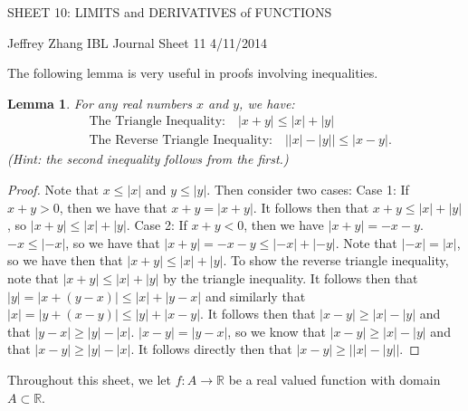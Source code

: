 \documentclass[12pt]{article}
\newcommand{\bbR}{\mathbb{R}}
\providecommand{\abs}[1]{\lvert #1 \rvert}
\providecommand{\arr}{\longrightarrow}
\renewcommand{\_}[1]{\underline{ #1 }}
\newtheorem{lemma}[theorem]{Lemma}
\theoremstyle{definition}
\numberwithin{equation}{subsection}
\begin{document}
\begin{center}
{\large SHEET 10: LIMITS and DERIVATIVES of FUNCTIONS} \\ 
\vspace{.2in}  
\end{center}
Jeffrey Zhang IBL Journal Sheet 11 4/11/2014
\bigskip \bigskip


\setcounter{section}{10}   
\setcounter{theorem}{-1} 

The following lemma is very useful in proofs involving inequalities.

\begin{lemma}  For any real numbers $x$ and $y$, we have: 
\begin{align*}
&\text{The Triangle Inequality:} \quad   \abs{x + y} \leq \abs{x} + \abs{y} \\
&\text{The Reverse Triangle Inequality:} \quad \abs{\abs{x} - \abs{y}} \leq \abs{x - y}.
\end{align*}
(Hint: the second inequality follows from the first.)
\end{lemma}

\begin{proof}
Note that $x \leq \abs{x}$ and $y \leq \abs{y}$. Then consider two cases: \newline
Case 1: If $x + y > 0$, then we have that $x + y = \abs{x + y}$. It follows then that $x + y \leq \abs{x} + \abs{y}$, so $\abs{x + y} \leq \abs{x} + \abs{y}$. \newline
Case 2: If $x + y < 0$, then we have $\abs{x + y} = -x - y$. $-x \leq \abs{-x}$, so we have that $\abs{x + y} = - x - y \leq \abs{-x} + \abs{-y}$. Note that $\abs{-x} = \abs{x}$, so we have then that $\abs{x + y} \leq \abs{x} + \abs{y}$. \newline
To show the reverse triangle inequality, note that $\abs{x + y} \leq \abs{x} + \abs{y}$ by the triangle inequality. It follows then that $\abs{y} = \abs{x + (y - x)} \leq \abs{x} + \abs{y - x}$ and similarly that $\abs{x} = \abs{y + (x - y)} \leq \abs{y} + \abs{x - y}$. It follows then that $\abs{x - y} \geq \abs{x} - \abs{y}$ and that $\abs{y - x} \geq \abs{y} - \abs{x}$. $\abs{x - y} = \abs{y - x}$, so we know that $\abs{x - y} \geq \abs{x} - \abs{y}$ and that $\abs{x - y} \geq \abs{y} - \abs{x}$. It follows directly then that $\abs{x - y} \geq \abs{\abs{x} - \abs{y}}$.
\end{proof}
Throughout this sheet, we let  $f \colon A \arr \bbR$
be a real valued function  with domain $A \subset \bbR$.
\end{document}
